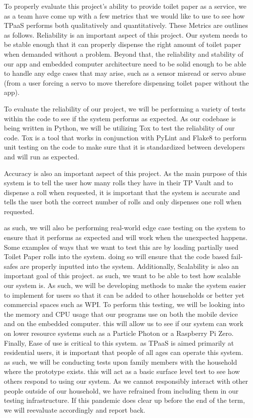 To properly evaluate this project's ability to provide toilet paper as a service, we as a team have come up with a few metrics that we would like to use to see how TPaaS performs both qualitatively and quantitatively. These Metrics are outlines as follows.
Reliability is an important aspect of this project. Our system needs to be stable enough that it can properly dispense the right amount of toilet paper when demanded without a problem. Beyond that, the reliability and stability of our app and embedded computer architecture need to be solid enough to be able to handle any edge cases that may arise, such as a sensor misread or servo abuse (from a user forcing a servo to move therefore dispensing toilet paper without the app).

To evaluate the reliability of our project, we will be performing a variety of tests within the code to see if the system performs as expected. As our codebase is being written in Python\cite{python}, we will be utilizing Tox\cite{tox} to test the reliability of our code. Tox is a tool that works in conjunction with PyLint\cite{pylint} and Flake8\cite{flake8} to perform unit testing on the code to make sure that it is standardized between developers and will run as expected. 

Accuracy is also an important aspect of this project. As the main purpose of this system is to tell the user how many rolls they have in their TP Vault and to dispense a roll when requested, it is important that the system is accurate and tells the user both the correct number of rolls and only dispenses one roll when requested.

as such, we will also be performing real-world edge case testing on the system to ensure that it performs as expected and will work when the unexpected happens. Some examples of ways that we want to test this are by loading partially used Toilet Paper rolls into the system. doing so will ensure that the code based fail-safes are properly inputted into the system. 
Additionally, Scalability is also an important goal of this project. as such, we want to be able to test how scalable our system is. As such, we will be developing methods to make the system easier to implement for users so that it can be added to other households or better yet commercial spaces such as WPI. 
To perform this testing, we will be looking into the memory and CPU usage that our programs use on both the mobile device and on the embedded computer. this will allow us to see if our system can work on lower resource systems such as a Particle Photon or a Raspberry Pi Zero.
Finally, Ease of use is critical to this system. as TPaaS is aimed primarily at residential users, it is important that people of all ages can operate this system. as such, we will be conducting tests upon family members with the household where the prototype exists. this will act as a basic surface level test to see how others respond to using our system. As we cannot responsibly interact with other people outside of our household, we have refrained from including them in our testing infrastructure. If this pandemic does clear up before the end of the term, we will reevaluate accordingly and report back.